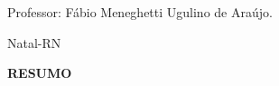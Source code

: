 \documentclass[a4paper,12pt]{article}
\newcommand{\cityandyear}{
\large Natal-RN\\
 \the\year 
 }
\begin{document}
\vspace{2cm}

\begin{center}

Professor:  Fábio Meneghetti Ugulino de Araújo.

\vspace{2.5cm}

\cityandyear

\end{center}

\newpage


\thispagestyle{empty}

\begin{center}
{\large \textbf{RESUMO}}
\end{center}

\vspace{1cm}
\end{document}
